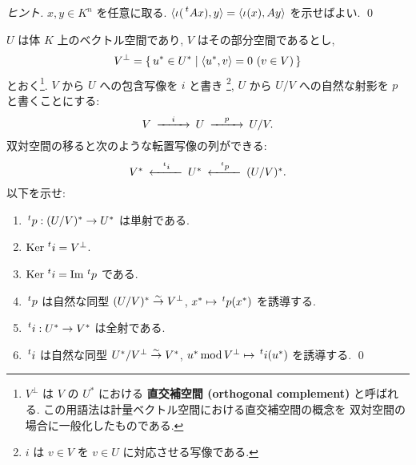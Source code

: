 \documentclass[12pt,twoside]{jarticle}
\begin{document}
\begin{proof}[ヒント]
  $x,y\in K^n$ を任意に取る.
  $\bra \iota(\tp{A}x), y\ket = \bra \iota(x),Ay\ket$ を示せばよい.
  \qed
\end{proof}


\begin{question}[商空間と部分空間の双対]
  $U$ は体 $K$ 上のベクトル空間であり, $V$ はその部分空間であるとし,
  \begin{equation*}
    V^\bot = \{\, u^*\in U^* \mid \langle u^*,v\rangle = 0 \ (v\in V) \,\}
  \end{equation*}
  とおく\footnote{$V^\bot$ は $V$ の $U^*$ における
    {\bf 直交補空間 (orthogonal complement)} と呼ばれる.
    この用語法は計量ベクトル空間における直交補空間の概念を
    双対空間の場合に一般化したものである.}.
  $V$ から $U$ への包含写像を $i$ と書き%
  \footnote{$i$ は $v\in V$ を $v\in U$ に対応させる写像である.}, 
  $U$ から $U/V$ への自然な射影を $p$ と書くことにする:
  \begin{equation*}
    \begin{CD}
      V @>i>> U @>p>> U/V. \\
    \end{CD}
  \end{equation*}
  双対空間の移ると次のような転置写像の列ができる:
  \begin{equation*}
    \begin{CD}
      V^* @<\tp{i}<< U^* @<\tp{p}<< (U/V)^*.
    \end{CD}
  \end{equation*}
  以下を示せ:
  \begin{enumerate}
  \item $\tp{p}:(U/V)^*\to U^*$ は単射である.
  \item $\Ker\tp{i}=V^\bot$.
  \item $\Ker\tp{i}=\Image\tp{p}$ である.
  \item $\tp{p}$ は自然な同型 $(U/V)^*\overset\sim\rightarrow V^\bot$,
    $x^*\mapsto \tp{p}(x^*)$ を誘導する.
  \item $\tp{i}:U^*\to V^*$ は全射である.
  \item $\tp{i}$ は自然な同型 $U^*/V^\bot \overset\sim\rightarrow V^*$,
    $u^*\MOD V^\bot \mapsto \tp{i}(u^*)$ を誘導する.
    \qed
  \end{enumerate}
\end{question}
\end{document}
